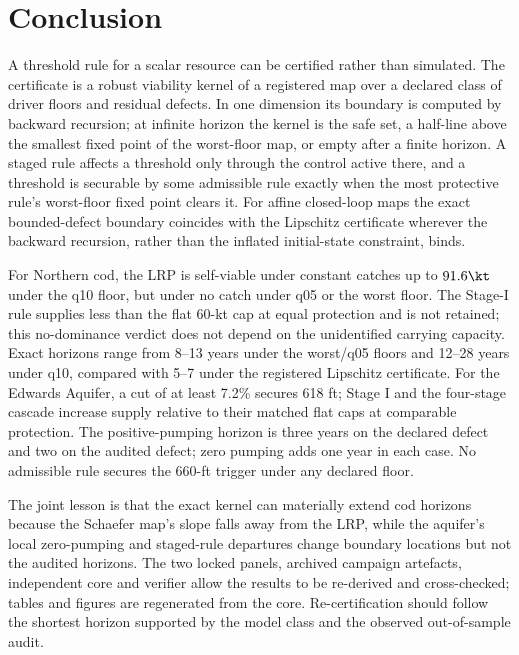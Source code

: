 \section{Conclusion}\label{sec:conclusion}

A threshold rule for a scalar resource can be certified rather than simulated. The certificate is a robust viability kernel of a registered map over a declared class of driver floors and residual defects. In one dimension its boundary is computed by backward recursion; at infinite horizon the kernel is the safe set, a half-line above the smallest fixed point of the worst-floor map, or empty after a finite horizon. A staged rule affects a threshold only through the control active there, and a threshold is securable by some admissible rule exactly when the most protective rule's worst-floor fixed point clears it. For affine closed-loop maps the exact bounded-defect boundary coincides with the Lipschitz certificate wherever the backward recursion, rather than the inflated initial-state constraint, binds.

For Northern cod, the LRP is self-viable under constant catches up to $91.6\kt$ under the q10 floor, but under no catch under q05 or the worst floor. The Stage-I rule supplies less than the flat 60-kt cap at equal protection and is not retained; this no-dominance verdict does not depend on the unidentified carrying capacity. Exact horizons range from 8--13 years under the worst/q05 floors and 12--28 years under q10, compared with 5--7 under the registered Lipschitz certificate. For the Edwards Aquifer, a cut of at least 7.2\% secures 618 ft; Stage I and the four-stage cascade increase supply relative to their matched flat caps at comparable protection. The positive-pumping horizon is three years on the declared defect and two on the audited defect; zero pumping adds one year in each case. No admissible rule secures the 660-ft trigger under any declared floor.

The joint lesson is that the exact kernel can materially extend cod horizons because the Schaefer map's slope falls away from the LRP, while the aquifer's local zero-pumping and staged-rule departures change boundary locations but not the audited horizons. The two locked panels, archived campaign artefacts, independent core and verifier allow the results to be re-derived and cross-checked; tables and figures are regenerated from the core. Re-certification should follow the shortest horizon supported by the model class and the observed out-of-sample audit.
